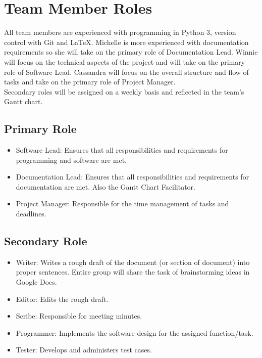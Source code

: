 \documentclass{article}
\begin{document}
\section{Team Member Roles}
\hspace{5mm}All team members are experienced with programming in Python 3, version control with Git and LaTeX. Michelle is more experienced with documentation requirements so she will take on the primary role of Documentation Lead. Winnie will focus on the technical aspects of the project and will take on the primary role of Software Lead. Cassandra will focus on the overall structure and flow of tasks and take on the primary role of Project Manager.\\

Secondary roles will be assigned on a weekly basis and reflected in the team's Gantt chart.

\subsection{Primary Role}
\begin{itemize}
\item Software Lead: Ensures that all responsibilities and requirements for programming and software are met. 
\item Documentation Lead: Ensures that all responsibilities and requirements for documentation are met. Also the Gantt Chart Facilitator.
\item Project Manager: Responsible for the time management of tasks and deadlines.
\end{itemize}

\subsection{Secondary Role}
\begin{itemize}
\item Writer: Writes a rough draft of the document (or section of document) into proper sentences. Entire group will share the task of brainstorming ideas in Google Docs.
\item Editor: Edits the rough draft.
\item Scribe: Responsible for meeting minutes. 
\item Programmer: Implements the software design for the assigned function/task.
\item Tester: Develops and administers test cases.
\end{itemize}
\end{document}
